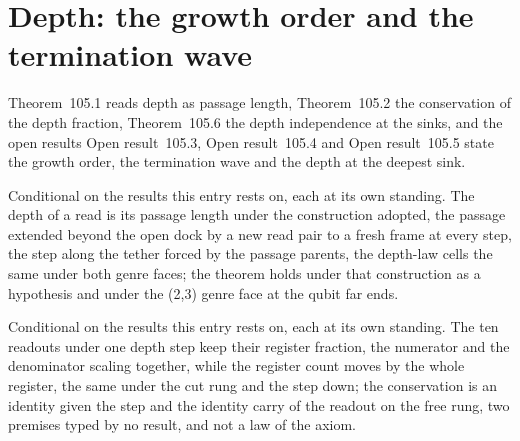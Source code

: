 \section{Depth: the growth order and the termination wave}\label{mod:X-4-depth-the-growth-order-and-the-termination-wave}
\label{narr:open:10-4}Theorem~105.1 reads depth as passage length, Theorem~105.2 the conservation of the depth fraction, Theorem~105.6 the depth independence at the sinks, and the open results Open result~105.3, Open result~105.4 and Open result~105.5 state the growth order, the termination wave and the depth at the deepest sink.
\begin{chconditional}\label{box:X-4-depth-the-growth-order-and-the-termination-wave:1}
Conditional on the results this entry rests on, each at its own standing. The depth of a read is its passage length under the construction adopted, the passage extended beyond the open dock by a new read pair to a fresh frame at every step, the step along the tether forced by the passage parents, the depth-law cells the same under both genre faces; the theorem holds under that construction as a hypothesis and under the (2,3) genre face at the qubit far ends.
\end{chconditional}
\begin{chconditional}\label{box:X-4-depth-the-growth-order-and-the-termination-wave:2}
Conditional on the results this entry rests on, each at its own standing. The ten readouts under one depth step keep their register fraction, the numerator and the denominator scaling together, while the register count moves by the whole register, the same under the cut rung and the step down; the conservation is an identity given the step and the identity carry of the readout on the free rung, two premises typed by no result, and not a law of the axiom.
\end{chconditional}
